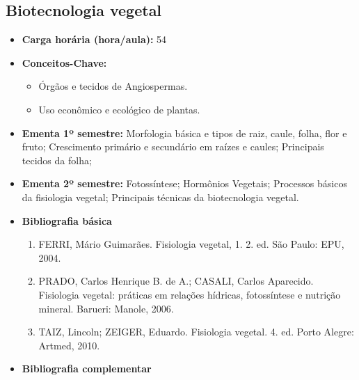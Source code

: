 \documentclass[11pt,fleqn]{book} %
\begin{document}
\subsection{Biotecnologia vegetal}\label{disc:biotecVegetal}
\begin{itemize}
	\item \textbf{Carga horária (hora/aula):} 54
	\item \textbf{Conceitos-Chave:}
	\begin{itemize}
		\item Órgãos e tecidos de Angiospermas.
		\item Uso econômico e ecológico de plantas. 
	\end{itemize}
	\item \textbf{Ementa 1º semestre:}
	Morfologia básica e tipos de raiz, caule, folha, flor e fruto; 
	Crescimento primário e secundário em raízes e caules; 
	Principais tecidos da folha;	
	\item \textbf{Ementa 2º semestre:}	
	Fotossíntese; 
	Hormônios Vegetais; 
	Processos básicos da fisiologia vegetal; 
	Principais técnicas da biotecnologia vegetal.
	\item \textbf{Bibliografia básica}
	\begin{enumerate}
		\item FERRI, Mário Guimarães. Fisiologia vegetal, 1. 2. ed. São Paulo: EPU, 2004. 
		\item PRADO, Carlos Henrique B. de A.; CASALI, Carlos Aparecido.  Fisiologia vegetal: práticas em relações hídricas, fotossíntese e nutrição mineral. Barueri: Manole, 2006.
		\item TAIZ, Lincoln; ZEIGER, Eduardo. Fisiologia vegetal. 4. ed. Porto Alegre: Artmed, 2010.
	\end{enumerate}
	\item \textbf{Bibliografia complementar}
	\begin{enumerate}

\end{enumerate}
\end{itemize}
\end{document}
